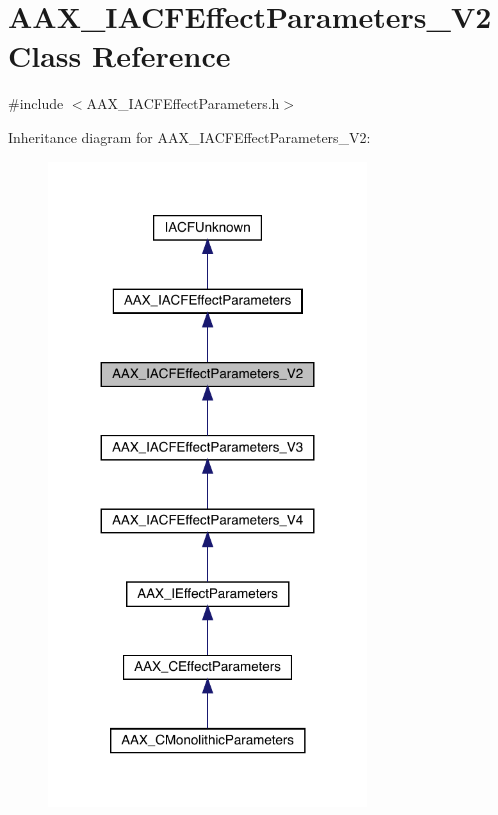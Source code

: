 \hypertarget{a01677}{}\section{A\+A\+X\+\_\+\+I\+A\+C\+F\+Effect\+Parameters\+\_\+\+V2 Class Reference}
\label{a01677}


{\ttfamily \#include $<$A\+A\+X\+\_\+\+I\+A\+C\+F\+Effect\+Parameters.\+h$>$}



Inheritance diagram for A\+A\+X\+\_\+\+I\+A\+C\+F\+Effect\+Parameters\+\_\+\+V2\+:
\nopagebreak
\begin{figure}[H]
\begin{center}
\leavevmode
\includegraphics[width=239pt]{a01676}
\end{center}
\end{figure}


